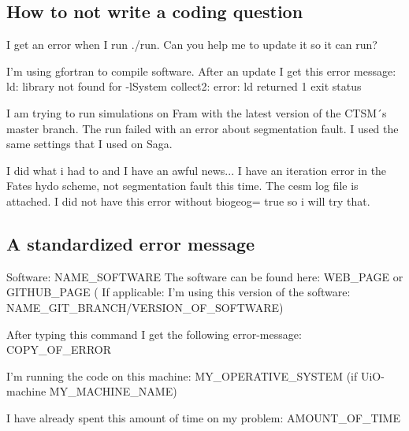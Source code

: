\documentclass[usenames,dvipsnames]{beamer}
\theoremstyle{plain}
\theoremstyle{definition}
\begin{document}
\subsection{How to not write a coding question}

\begin{frame}{\setframetitle{}}
  {
    I get an error when I run ./run. Can you help me to update it so it can run?

    \newline
I’m using gfortran to compile software. After an update I get this error message:
ld: library not found for -lSystem
collect2: error: ld returned 1 exit status

\newline

I am trying to run simulations on Fram with the latest version of the CTSM´s master branch. The run failed with an error about segmentation fault. I used the same settings that I used on Saga.

\newline

I did what i had to and I have an awful news... I have an iteration error in the Fates hydo scheme, not segmentation fault this time. The cesm log file is attached.
I did not have this error without biogeog= true so i will try that.

  }
\end{frame}






\subsection{A standardized error message}

\begin{frame}{\setframetitle{}}
  {
    Software: NAME\_SOFTWARE \newline
    The software can be found here: WEB\_PAGE or GITHUB\_PAGE \newline
    ( If applicable: I’m using this version of the software: NAME\_GIT\_BRANCH/VERSION\_OF\_SOFTWARE) \newline

After typing this command I get the following error-message: COPY\_OF\_ERROR \newline

I'm running the code on this machine: MY\_OPERATIVE\_SYSTEM (if UiO-machine MY\_MACHINE\_NAME)\newline

I have already spent this amount of time on my problem: AMOUNT\_OF\_TIME

  }
\end{frame}
\end{document}
